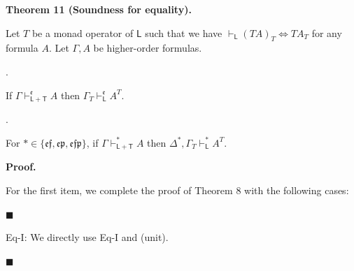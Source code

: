  
 
\par\medskip\noindent\textbf{Theorem 11 (Soundness for equality).}\par
 
 
Let $T$ be a monad operator of $\mathsf{L}$ such that we have $\vdash_{\mathsf{L}}(TA)_{T}\Leftrightarrow TA_{T}$ for any formula $A$. Let $\Gamma,A$ be higher-order formulas.\par
  
\par{}. 
 
If $\Gamma\vdash_{\mathsf{L}+\mathsf{T}}^{\mathfrak{e}}A$ then $\Gamma_{T}\vdash_{\mathsf{L}}^{\mathfrak{e}}A^{T}$.\par
 
 
 
\par{}. 
 
For $*\in\{\mathfrak{e}\mathfrak{f},\mathfrak{e}\mathfrak{p},\mathfrak{e}\mathfrak{f}\mathfrak{p}\}$, if $\Gamma\vdash_{\mathsf{L}+\mathsf{T}}^{*}A$ then $\Delta^{*},\Gamma_{T}\vdash_{\mathsf{L}}^{*}A^{T}$.\par
 
 
  
 
 
 
 
\par\medskip\noindent\textbf{Proof.}\par
 
 
For the first item, we complete the proof of Theorem 8 with the following cases:\par
  
\par\noindent  $\blacksquare$ 
 
Eq-I: We directly use Eq-I and (unit).\par
 
 
 
\par\noindent  $\blacksquare$ 
 
